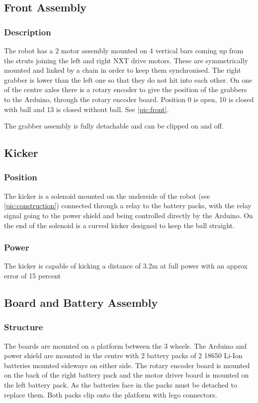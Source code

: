 \subsection{Front Assembly}
\subsubsection{Description}
The robot has a 2 motor assembly mounted on 4 vertical bars coming up from the struts joining the left and right NXT drive motors. These are symmetrically mounted and linked by a chain in order to keep them synchronised. The right grabber is lower than the left one so that they do not hit into each other. On one of the centre axles there is a rotary encoder to give the position of the grabbers to the Arduino, through the rotary encoder board. Position 0 is open, 10 is closed with ball and 13 is closed without ball. See \autoref{pic:front}.

The grabber assembly is fully detachable and can be clipped on and off. 


\subsection{Kicker}
\subsubsection{Position}
The kicker is a solenoid mounted on the underside of the robot (see \autoref{pic:construction}) connected through a relay to the battery packs, with the relay signal going to the power shield and being controlled directly by the Arduino. On the end of the solenoid is a curved kicker designed to keep the ball straight.

\subsubsection{Power}
The kicker is capable of kicking a distance of 3.2m at full power with an approx error of 15 percent

\subsection{Board and Battery Assembly}
\subsubsection{Structure}
The boards are mounted on a platform between the 3 wheels. The Arduino and power
shield are mounted in the centre with 2 battery packs of 2 18650 Li-Ion batteries mounted sideways on either
side. The rotary encoder board is
mounted on the back of the right battery pack and the motor driver board is mounted
on the left battery pack. As the batteries face in the packs must be detached to
replace them. Both packs clip onto the platform with lego connectors.

